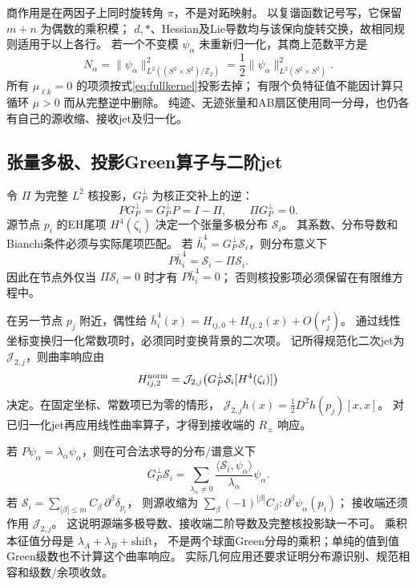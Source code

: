 \documentclass[UTF8,a4paper,11pt,fontset=fandol]{ctexart}
\numberwithin{equation}{section}
\theoremstyle{definition}
\newcommand{\Z}{\mathbb Z}
\begin{document}
商作用是在两因子上同时旋转角 $\pi$，不是对跖映射。
以复谐函数记号写，它保留 $m+n$ 为偶数的乘积模；
$d,*$、Hessian及Lie导数均与该保向旋转交换，故相同规则适用于以上各行。
若一个不变模 $\psi_\alpha$ 未重新归一化，其商上范数平方是
\[
N_\alpha=\|\psi_\alpha\|_{L^2((S^2\times S^2)/\Z_2)}^2
=\frac12\|\psi_\alpha\|_{L^2(S^2\times S^2)}^2.
\]
所有 $\mu_{\ell k}=0$ 的项须按式\eqref{eq:fullkernel}投影去掉；
有限个负特征值不能因计算只循环 $\mu>0$ 而从完整逆中删除。
纯迹、无迹张量和AB扇区使用同一分母，也仍各有自己的源收缩、接收jet及归一化。

\subsection{张量多极、投影Green算子与二阶jet}\label{sec:greenjet}
令 $\Pi$ 为完整 $L^2$ 核投影，$G_P^\perp$ 为核正交补上的逆：
\[
P G_P^\perp=G_P^\perp P=I-\Pi,\qquad
\Pi G_P^\perp=0.
\]
源节点 $p_i$ 的EH尾项 $H^4(\zeta_i)$ 决定一个张量多极分布 $\mathcal S_i$。
其系数、分布导数和Bianchi条件必须与实际尾项匹配。
若 $\bar h_i^4=G_P^\perp\mathcal S_i$，则分布意义下
\[
P\bar h_i^4=\mathcal S_i-\Pi\mathcal S_i.
\]
因此在节点外仅当 $\Pi\mathcal S_i=0$ 时才有 $P\bar h_i^4=0$；
否则核投影项必须保留在有限维方程中。

在另一节点 $p_j$ 附近，偶性给
$\bar h_i^4(x)=H_{ij,0}+H_{ij,2}(x)+O(r_j^4)$。
通过线性坐标变换归一化常数项时，必须同时变换背景的二次项。
记所得规范化二次jet为 $\mathcal J_{2,j}$，则曲率响应由
\begin{equation}\label{eq:greenjet}
H_{ij,2}^{\rm norm}
=\mathcal J_{2,j}\!\left(G_P^\perp\mathcal S_i[H^4(\zeta_i)]\right)
\end{equation}
决定。在固定坐标、常数项已为零的情形，
$\mathcal J_{2,j}h(x)=\frac12D^2h(p_j)[x,x]$。
对已归一化jet再应用线性曲率算子，才得到接收端的 $R_\pm$ 响应。

若 $P\psi_\alpha=\lambda_\alpha\psi_\alpha$，则在可合法求导的分布/谱意义下
\[
G_P^\perp\mathcal S_i
=\sum_{\lambda_\alpha\ne0}
\frac{\langle\mathcal S_i,\psi_\alpha\rangle}{\lambda_\alpha}\psi_\alpha .
\]
若 $\mathcal S_i=\sum_{|\beta|\le m}C_\beta\,\partial^\beta\delta_{p_i}$，
则源收缩为
$\sum_\beta(-1)^{|\beta|}C_\beta:\partial^\beta\psi_\alpha(p_i)$；
接收端还须作用 $\mathcal J_{2,j}$。
这说明源端多极导数、接收端二阶导数及完整核投影缺一不可。
乘积本征值分母是 $\lambda_A+\lambda_B+\mathrm{shift}$，
不是两个球面Green分母的乘积；单纯的值到值Green级数也不计算这个曲率响应。
实际几何应用还要求证明分布源识别、规范相容和级数/余项收敛。
\end{document}
